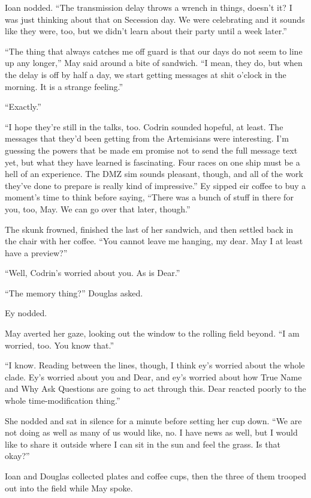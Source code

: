 Ioan nodded. ``The transmission delay throws a wrench in things, doesn't it? I was just thinking about that on Secession day. We were celebrating and it sounds like they were, too, but we didn't learn about their party until a week later.''

``The thing that always catches me off guard is that our days do not seem to line up any longer,'' May said around a bite of sandwich. ``I mean, they do, but when the delay is off by half a day, we start getting messages at shit o'clock in the morning. It is a strange feeling.''

``Exactly.''

``I hope they're still in the talks, too. Codrin sounded hopeful, at least. The messages that they'd been getting from the Artemisians were interesting. I'm guessing the powers that be made em promise not to send the full message text yet, but what they have learned is fascinating. Four races on one ship must be a hell of an experience. The DMZ sim sounds pleasant, though, and all of the work they've done to prepare is really kind of impressive.'' Ey sipped eir coffee to buy a moment's time to think before saying, ``There was a bunch of stuff in there for you, too, May. We can go over that later, though.''

The skunk frowned, finished the last of her sandwich, and then settled back in the chair with her coffee. ``You cannot leave me hanging, my dear. May I at least have a preview?''

``Well, Codrin's worried about you. As is Dear.''

``The memory thing?'' Douglas asked.

Ey nodded.

May averted her gaze, looking out the window to the rolling field beyond. ``I am worried, too. You know that.''

``I know. Reading between the lines, though, I think ey's worried about the whole clade. Ey's worried about you and Dear, and ey's worried about how True Name and Why Ask Questions are going to act through this. Dear reacted poorly to the whole time-modification thing.''

She nodded and sat in silence for a minute before setting her cup down. ``We are not doing as well as many of us would like, no. I have news as well, but I would like to share it outside where I can sit in the sun and feel the grass. Is that okay?''

Ioan and Douglas collected plates and coffee cups, then the three of them trooped out into the field while May spoke.

